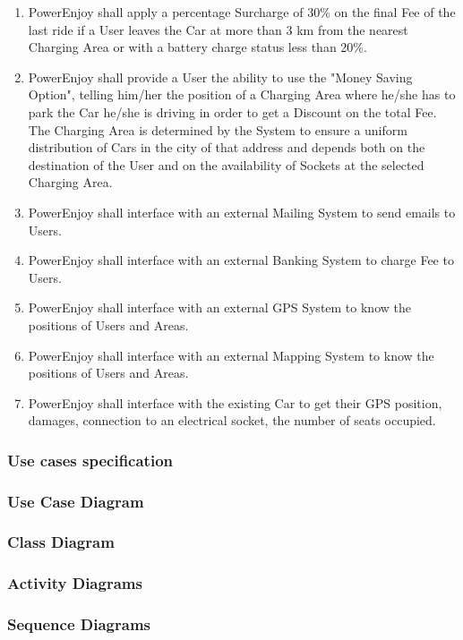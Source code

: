 \begin{enumerate}[label=R\arabic*]
\item PowerEnjoy shall apply a percentage Surcharge of 30\% on the final Fee of the last ride if a User leaves the Car at more than 3 km from the nearest Charging Area or with a battery charge status less than 20\%.
\item PowerEnjoy shall provide a User the ability to use the "Money Saving Option", telling him/her the position of a Charging Area where he/she has to park the Car he/she is driving in order to get a Discount on the total Fee. The Charging Area is determined by the System to ensure a uniform distribution of Cars in the city of that address and depends both on the destination of the User and on the availability of Sockets at the selected Charging Area.
\item PowerEnjoy shall interface with an external Mailing System to send emails to Users.
\item PowerEnjoy shall interface with an external Banking System to charge Fee to Users.
\item PowerEnjoy shall interface with an external GPS System to know the positions of Users and Areas.
\item PowerEnjoy shall interface with an external Mapping System to know the positions of Users and Areas.
\item PowerEnjoy shall interface with the existing Car to get their GPS position, damages, connection to an electrical socket, the number of seats occupied. 
\end{enumerate}

\subsubsection{Use cases specification}

\subsubsection{Use Case Diagram}
\subsubsection{Class Diagram}
\subsubsection{Activity Diagrams}
\subsubsection{Sequence Diagrams}
